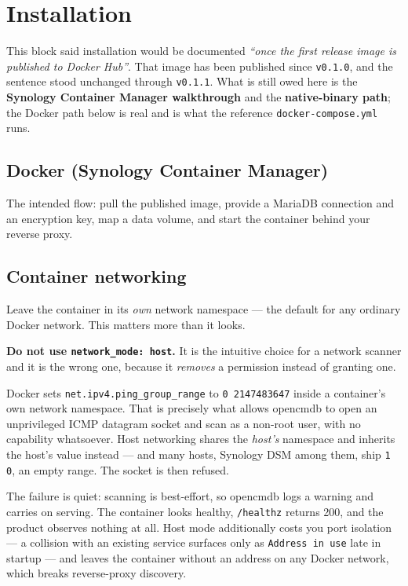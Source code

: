\documentclass[11pt,oneside,listof=totoc,bibliography=totoc]{scrreprt}
\begin{document}
\chapter{Installation}
\begin{planned}
This block said installation would be documented \emph{``once the first release image is
published to Docker Hub''}. That image has been published since \texttt{v0.1.0}, and the
sentence stood unchanged through \texttt{v0.1.1}. What is still owed here is the
\textbf{Synology Container Manager walkthrough} and the \textbf{native-binary path}; the
Docker path below is real and is what the reference \texttt{docker-compose.yml} runs.
\end{planned}

\section{Docker (Synology Container Manager)}
The intended flow: pull the published image, provide a MariaDB connection and an encryption
key, map a data volume, and start the container behind your reverse proxy.

\section{Container networking}
\label{sec:container-networking}
Leave the container in its \emph{own} network namespace --- the default for any ordinary Docker
network. This matters more than it looks.

\begin{warning}
\textbf{Do not use \texttt{network\_mode: host}.} It is the intuitive choice for a network
scanner and it is the wrong one, because it \emph{removes} a permission instead of granting one.

Docker sets \texttt{net.ipv4.ping\_group\_range} to \texttt{0 2147483647} inside a container's
own network namespace. That is precisely what allows opencmdb to open an unprivileged ICMP
datagram socket and scan as a non-root user, with no capability whatsoever. Host networking
shares the \emph{host's} namespace and inherits the host's value instead --- and many hosts,
Synology DSM among them, ship \texttt{1 0}, an empty range. The socket is then refused.

The failure is quiet: scanning is best-effort, so opencmdb logs a warning and carries on
serving. The container looks healthy, \texttt{/healthz} returns 200, and the product observes
nothing at all. Host mode additionally costs you port isolation --- a collision with an existing
service surfaces only as \texttt{Address in use} late in startup --- and leaves the container
without an address on any Docker network, which breaks reverse-proxy discovery.
\end{warning}
\end{document}
